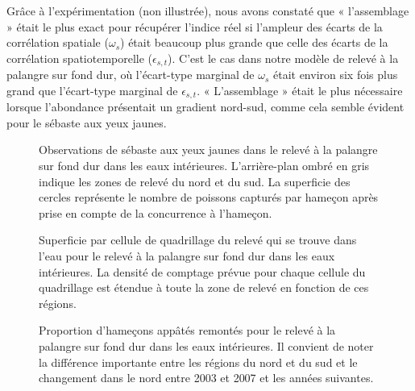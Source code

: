\documentclass[11pt]{book}
\begin{document}
Grâce à l'expérimentation (non illustrée), nous avons constaté que « l'assemblage » était le plus exact pour récupérer l'indice réel si l'ampleur des écarts de la corrélation spatiale (\(\omega_s\)) était beaucoup plus grande que celle des écarts de la corrélation spatiotemporelle (\(\epsilon_{s,t}\)). C'est le cas dans notre modèle de relevé à la palangre sur fond dur, où l'écart-type marginal de \(\omega_s\) était environ six fois plus grand que l'écart-type marginal de \(\epsilon_{s,t}\). « L'assemblage » était le plus nécessaire lorsque l'abondance présentait un gradient nord-sud, comme cela semble évident pour le sébaste aux yeux jaunes.
\begin{figure}[htb]

{\centering {} 

}

\caption{Observations de sébaste aux yeux jaunes dans le relevé à la palangre sur fond dur dans les eaux intérieures. L’arrière-plan ombré en gris indique les zones de relevé du nord et du sud. La superficie des cercles représente le nombre de poissons capturés par hameçon après prise en compte de la concurrence à l’hameçon.}\label{fig:hbll-raw}
\end{figure}
\begin{figure}[htb]

{\centering {} 

}

\caption{Superficie par cellule de quadrillage du relevé qui se trouve dans l’eau pour le relevé à la palangre sur fond dur dans les eaux intérieures. La densité de comptage prévue pour chaque cellule du quadrillage est étendue à toute la zone de relevé en fonction de ces régions.}\label{fig:hbll-area-grid}
\end{figure}
\begin{figure}[htb]

{\centering {} 

}

\caption{Proportion d’hameçons appâtés remontés pour le relevé à la palangre sur fond dur dans les eaux intérieures. Il convient de noter la différence importante entre les régions du nord et du sud et le changement dans le nord entre 2003 et 2007 et les années suivantes.}\label{fig:hbll-baited}
\end{figure}
\end{document}
